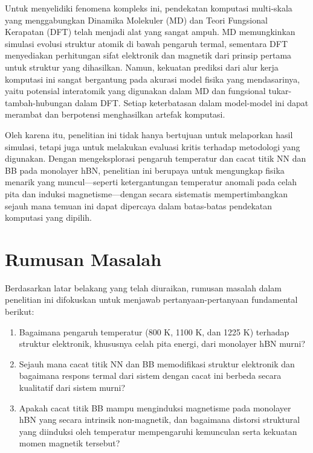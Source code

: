 Untuk menyelidiki fenomena kompleks ini, pendekatan komputasi multi-skala yang menggabungkan Dinamika Molekuler (MD) dan Teori Fungsional Kerapatan (DFT) telah menjadi alat yang sangat ampuh. MD memungkinkan simulasi evolusi struktur atomik di bawah pengaruh termal, sementara DFT menyediakan perhitungan sifat elektronik dan magnetik dari prinsip pertama untuk struktur yang dihasilkan. Namun, kekuatan prediksi dari alur kerja komputasi ini sangat bergantung pada akurasi model fisika yang mendasarinya, yaitu potensial interatomik yang digunakan dalam MD dan fungsional tukar-tambah-hubungan dalam DFT. Setiap keterbatasan dalam model-model ini dapat merambat dan berpotensi menghasilkan artefak komputasi.

Oleh karena itu, penelitian ini tidak hanya bertujuan untuk melaporkan hasil simulasi, tetapi juga untuk melakukan evaluasi kritis terhadap metodologi yang digunakan. Dengan mengeksplorasi pengaruh temperatur dan cacat titik NN dan BB pada monolayer hBN, penelitian ini berupaya untuk mengungkap fisika menarik yang muncul—seperti ketergantungan temperatur anomali pada celah pita dan induksi magnetisme—dengan secara sistematis mempertimbangkan sejauh mana temuan ini dapat dipercaya dalam batas-batas pendekatan komputasi yang dipilih.

\section{Rumusan Masalah}
Berdasarkan latar belakang yang telah diuraikan, rumusan masalah dalam penelitian ini difokuskan untuk menjawab pertanyaan-pertanyaan fundamental berikut:
\begin{enumerate}
    \item Bagaimana pengaruh temperatur (800 K, 1100 K, dan 1225 K) terhadap struktur elektronik, khususnya celah pita energi, dari monolayer hBN murni?
    \item Sejauh mana cacat titik NN dan BB memodifikasi struktur elektronik dan bagaimana respons termal dari sistem dengan cacat ini berbeda secara kualitatif dari sistem murni?
    \item Apakah cacat titik BB mampu menginduksi magnetisme pada monolayer hBN yang secara intrinsik non-magnetik, dan bagaimana distorsi struktural yang diinduksi oleh temperatur mempengaruhi kemunculan serta kekuatan momen magnetik tersebut?
\end{enumerate}

